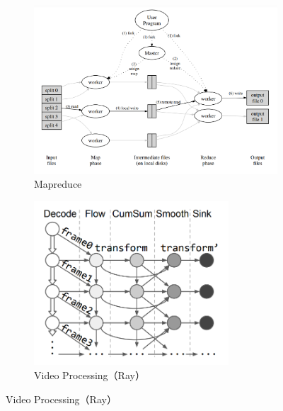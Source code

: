 \begin{figure}[h]
	\begin{minipage}{0.49\linewidth}
		\centering
		\begin{subfigure}{\textwidth}
		\includegraphics[width=\textwidth]{image/chap01/mapreduce.png}
		\caption{Mapreduce}
		\label{fig:mapreduce}
	\end{subfigure}
	\end{minipage}
	\begin{minipage}{0.49\linewidth}
		\centering
		\begin{subfigure}{\textwidth}
		\includegraphics[width=0.8\textwidth]{image/chap01/ray.png}
		\caption{Video Processing（Ray）}
		\label{fig:video_processing}
	\end{subfigure}
	\end{minipage}
	\label{fig:framework}
\end{figure}

